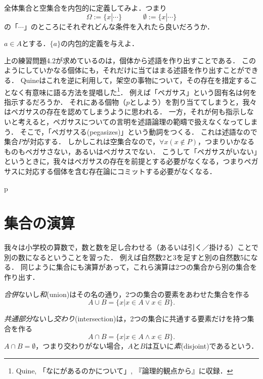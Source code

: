 \documentclass[11pt,a4paper]{jsarticle}
\begin{document}
\begin{exercise}
全体集合と空集合を内包的に定義してみよ．つまり
\[
\Omega := \{ x | \cdots \}  \hspace{3em} \emptyset := \{ x | \cdots \}
\]
の「$\cdots$」のところにそれぞれどんな条件を入れたら良いだろうか． 
\end{exercise}

\begin{exercise}
$a \in A$とする．$\{a\}$の内包的定義を与えよ． 
\end{exercise}

\begin{example}
上の練習問題4.2が求めているのは，個体から述語を作り出すことである．
このようにしていかなる個体にも，それだけに当てはまる述語を作り出すことができる．
Quineはこれを逆に利用して，架空の事物について，その存在を措定することなく有意味に語る方法を提唱した\footnote{Quine, 「なにがあるのかについて」, 『論理的観点から』に収録．}．
例えば「ペガサス」という固有名は何を指示するだろうか．
それにある個物（$p$としよう）を割り当ててしまうと，我々はペガサスの存在を認めてしまうように思われる．
一方，それが何も指示しないと考えると，ペガサスについての言明を述語論理の範疇で扱えなくなってしまう．
そこで，「ペガサスる(pegasizes)」という動詞をつくる．
これは述語なので集合$P$が対応する．
しかしこれは空集合なので，$\forall x (x \not\in P)$，つまりいかなるものもペガサさない，あるいはペガサスでない．
こうして「ペガサスがいない」というときに，我々はペガサスの存在を前提とする必要がなくなる，つまりペガサスに対応する個体を含む存在論にコミットする必要がなくなる．
\end{example}

p
\section{集合の演算}
\label{sec:setoperation}
我々は小学校の算数で，数と数を足し合わせる（あるいは引く／掛ける）ことで別の数になるということを習った．
例えば自然数2と3を足すと別の自然数5になる．
同じように集合にも演算があって，これら演算は2つの集合から別の集合を作り出す．

\emph{合併}ないし\emph{和}(union)はその名の通り，2つの集合の要素をあわせた集合を作る
\[
 A \cup B = \{ x | x \in A \vee x \in B\} .
\]


\emph{共通部分}ないし\emph{交わり}(intersection)は，2つの集合に共通する要素だけを持つ集合を作る
\[
 A \cap B = \{ x | x \in A \wedge x \in B\}.
\]
$A \cap B = \emptyset$，つまり交わりがない場合，$A$と$B$は互いに\emph{素}(disjoint)であるという．
\end{document}
